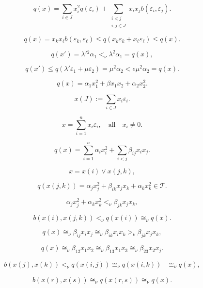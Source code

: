 \documentclass{article}
\begin{document}
\begin{equation}
q(x)=\sum_{i\in J }x _i^2q({\varepsilon}_i)+\sum_{\substack{i<j\\i,j\in J }}x _ix _j
b({\varepsilon}_i,{\varepsilon}_j).\tag{}
\end{equation}

$$ q(x) = x_k x_\ell b({\varepsilon}_k, {\varepsilon}_\ell) \leq q(x_k {\varepsilon}_k +  x_\ell {\varepsilon}_\ell) \leq q(x).$$

$$q(x')={\lambda} '{}^2{\alpha} _1<_\nu{\lambda} ^2{\alpha} _1=q(x),$$

$$q(x')\leq q({\lambda} '{\varepsilon}_1+\mu{\varepsilon}_2)=\mu^2{\alpha} _2<e\mu^2{\alpha} _2=q(x).$$

\begin{equation}\label{eq:sstr}
q(x) = {\alpha}_1 x_1^2 + {\beta} x_1 x_2 + {\alpha}_2 x_2^2.
\tag{}
\end{equation}

$$x( J ):=\sum_{i\in  J } x_i{\varepsilon}_i.$$

$$x=\sum_{i=1}^n x_i{\varepsilon}_i,\quad\text{all}\quad x_i\ne0.$$

\begin{equation}\label{eq:7.1}
q(x)=\sum_{i=1}^n{\alpha}_ix_i^2+\sum_{i<j}{\beta}_{ij}x_ix_j.
\end{equation}

$$x=x(i)\vee x(j,k),$$

$$q(x(j,k))={\alpha}_jx_j^2+{\beta}_{ik}x_jx_k+{\alpha}_kx_k^2\in {\mathcal T}.$$

$${\alpha}_jx_j^2+{\alpha}_kx_k^2<_\nu {\beta}_{jk}x_jx_k,$$

$$b(x(i),x(j,k))<_\nu q(x(i)) \cong_\nu q(x).$$

\begin{equation}\label{eq:7.2}
q(x)\cong_\nu{\beta}_{ij}x_ix_j\cong_\nu{\beta}_{ik}x_ix_k>_\nu{\beta}_{jk}x_jx_k,
\end{equation}

\begin{equation}\label{eq:7.3}
q(x)\cong_\nu{\beta}_{12}x_1x_2\cong_\nu{\beta}_{13}x_1x_3 \cong_\nu{\beta}_{23}x_2x_j.
\end{equation}

\begin{align*}
b(x(j),x(k))<_\nu q(x(i,j))\cong_\nu q(x(i,k))
&\cong_\nu q(x), \end{align*}

$$b (x(r),x(s))\cong_\nu q(x(r,s))\cong_\nu q(x).$$
\end{document}
